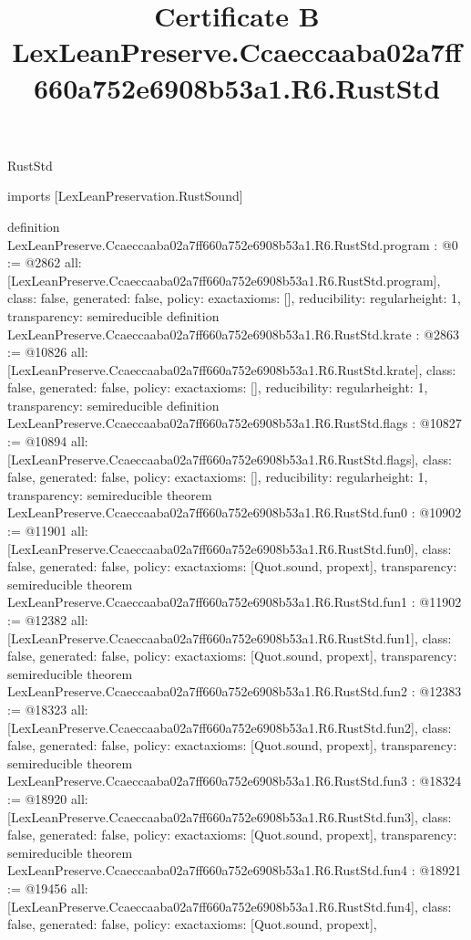 \begin{lexlean}{RustStd}
\title{Certificate B LexLeanPreserve.Ccaeccaaba02a7ff660a752e6908b53a1.R6.RustStd}
\begin{coremodule}
imports [LexLeanPreservation.RustSound]

definition LexLeanPreserve.Ccaeccaaba02a7ff660a752e6908b53a1.R6.RustStd.program : @0 := @2862 {
  all: [LexLeanPreserve.Ccaeccaaba02a7ff660a752e6908b53a1.R6.RustStd.program],
  class: false,
  generated: false,
  policy: exact{axioms: []},
  reducibility: regular{height: 1},
  transparency: semireducible
}
definition LexLeanPreserve.Ccaeccaaba02a7ff660a752e6908b53a1.R6.RustStd.krate : @2863 := @10826 {
  all: [LexLeanPreserve.Ccaeccaaba02a7ff660a752e6908b53a1.R6.RustStd.krate],
  class: false,
  generated: false,
  policy: exact{axioms: []},
  reducibility: regular{height: 1},
  transparency: semireducible
}
definition LexLeanPreserve.Ccaeccaaba02a7ff660a752e6908b53a1.R6.RustStd.flags : @10827 := @10894 {
  all: [LexLeanPreserve.Ccaeccaaba02a7ff660a752e6908b53a1.R6.RustStd.flags],
  class: false,
  generated: false,
  policy: exact{axioms: []},
  reducibility: regular{height: 1},
  transparency: semireducible
}
theorem LexLeanPreserve.Ccaeccaaba02a7ff660a752e6908b53a1.R6.RustStd.fun0 : @10902 := @11901 {
  all: [LexLeanPreserve.Ccaeccaaba02a7ff660a752e6908b53a1.R6.RustStd.fun0],
  class: false,
  generated: false,
  policy: exact{axioms: [Quot.sound, propext]},
  transparency: semireducible
}
theorem LexLeanPreserve.Ccaeccaaba02a7ff660a752e6908b53a1.R6.RustStd.fun1 : @11902 := @12382 {
  all: [LexLeanPreserve.Ccaeccaaba02a7ff660a752e6908b53a1.R6.RustStd.fun1],
  class: false,
  generated: false,
  policy: exact{axioms: [Quot.sound, propext]},
  transparency: semireducible
}
theorem LexLeanPreserve.Ccaeccaaba02a7ff660a752e6908b53a1.R6.RustStd.fun2 : @12383 := @18323 {
  all: [LexLeanPreserve.Ccaeccaaba02a7ff660a752e6908b53a1.R6.RustStd.fun2],
  class: false,
  generated: false,
  policy: exact{axioms: [Quot.sound, propext]},
  transparency: semireducible
}
theorem LexLeanPreserve.Ccaeccaaba02a7ff660a752e6908b53a1.R6.RustStd.fun3 : @18324 := @18920 {
  all: [LexLeanPreserve.Ccaeccaaba02a7ff660a752e6908b53a1.R6.RustStd.fun3],
  class: false,
  generated: false,
  policy: exact{axioms: [Quot.sound, propext]},
  transparency: semireducible
}
theorem LexLeanPreserve.Ccaeccaaba02a7ff660a752e6908b53a1.R6.RustStd.fun4 : @18921 := @19456 {
  all: [LexLeanPreserve.Ccaeccaaba02a7ff660a752e6908b53a1.R6.RustStd.fun4],
  class: false,
  generated: false,
  policy: exact{axioms: [Quot.sound, propext]},
}
\end{coremodule}
\end{lexlean}
